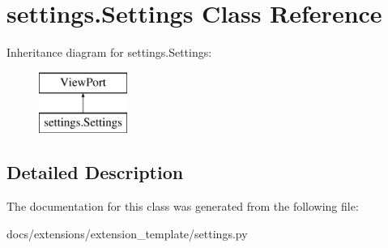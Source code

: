 \hypertarget{classsettings_1_1Settings}{\section{settings.\+Settings Class Reference}
\label{classsettings_1_1Settings}
}
Inheritance diagram for settings.\+Settings\+:\begin{figure}[H]
\begin{center}
\leavevmode
\includegraphics[height=2.000000cm]{classsettings_1_1Settings}
\end{center}
\end{figure}


\subsection{Detailed Description}
\begin{DoxyVerb}\end{DoxyVerb}
 

The documentation for this class was generated from the following file\+:\begin{DoxyCompactItemize}
\item 
docs/extensions/extension\+\_\+template/settings.\+py\end{DoxyCompactItemize}
